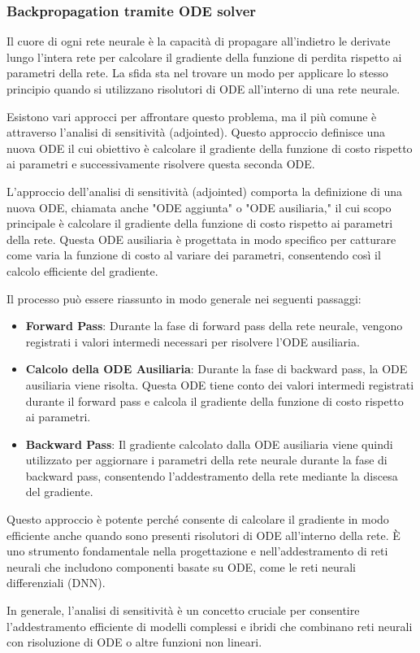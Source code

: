 \subsubsection{Backpropagation tramite ODE solver}

Il cuore di ogni rete neurale è la capacità di propagare all'indietro 
le derivate lungo l'intera rete per calcolare il gradiente della 
funzione di perdita rispetto ai parametri della rete. La sfida sta nel 
trovare un modo per applicare lo stesso principio quando si utilizzano 
risolutori di ODE all'interno di una rete neurale.

Esistono vari approcci per affrontare questo problema, ma il più comune 
è attraverso l'analisi di sensitività (adjointed). Questo approccio 
definisce una nuova ODE il cui obiettivo è calcolare il gradiente della 
funzione di costo rispetto ai parametri e successivamente risolvere 
questa seconda ODE.

L'approccio dell'analisi di sensitività (adjointed) comporta la 
definizione di una nuova ODE, chiamata anche "ODE aggiunta" o 
"ODE ausiliaria," il cui scopo principale è calcolare il gradiente 
della funzione di costo rispetto ai parametri della rete. 
Questa ODE ausiliaria è progettata in modo specifico per catturare 
come varia la funzione di costo al variare dei parametri, 
consentendo così il calcolo efficiente del gradiente.

Il processo può essere riassunto in modo generale nei seguenti passaggi:

\begin{itemize}
    \item \textbf{Forward Pass}: Durante la fase di forward pass 
    della rete neurale, vengono registrati i valori intermedi 
    necessari per risolvere l'ODE ausiliaria.
    \item \textbf{Calcolo della ODE Ausiliaria}: Durante la fase di 
    backward pass, la ODE ausiliaria viene risolta. 
    Questa ODE tiene conto dei valori intermedi registrati durante 
    il forward pass e calcola il gradiente della funzione di costo 
    rispetto ai parametri.
    \item \textbf{Backward Pass}: Il gradiente calcolato dalla ODE 
    ausiliaria viene quindi utilizzato per aggiornare i parametri 
    della rete neurale durante la fase di backward pass, consentendo 
    l'addestramento della rete mediante la discesa del gradiente.
\end{itemize}

Questo approccio è potente perché consente di calcolare il gradiente 
in modo efficiente anche quando sono presenti risolutori di ODE 
all'interno della rete. È uno strumento fondamentale nella progettazione 
e nell'addestramento di reti neurali che includono componenti basate 
su ODE, come le reti neurali differenziali (DNN).

In generale, l'analisi di sensitività è un concetto cruciale per 
consentire l'addestramento efficiente di modelli complessi e ibridi 
che combinano reti neurali con risoluzione di ODE o altre funzioni non 
lineari.